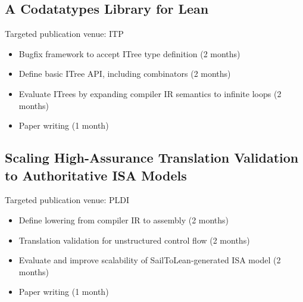 \documentclass[a4paper]{scrartcl}
\begin{document}
\subsection*{A Codatatypes Library for
Lean}\label{a-codatatypes-library-for-lean-1}

Targeted publication venue: ITP

\begin{itemize}
\item
  Bugfix framework to accept ITree type definition (2 months)
\item
  Define basic ITree API, including combinators (2 months)
\item
  Evaluate ITrees by expanding compiler IR semantics to infinite loops
  (2 months)
\item
  Paper writing (1 month)
\end{itemize}

\subsection*{Scaling High-Assurance Translation Validation to
Authoritative ISA
Models}\label{scaling-high-assurance-translation-validation-to-authoritative-isa-models-1}

Targeted publication venue: PLDI

\begin{itemize}
\item
  Define lowering from compiler IR to assembly (2 months)
\item
  Translation validation for unstructured control flow (2 months)
\item
  Evaluate and improve scalability of SailToLean-generated ISA model (2
  months)
\item
  Paper writing (1 month)
\end{itemize}









\end{document}
